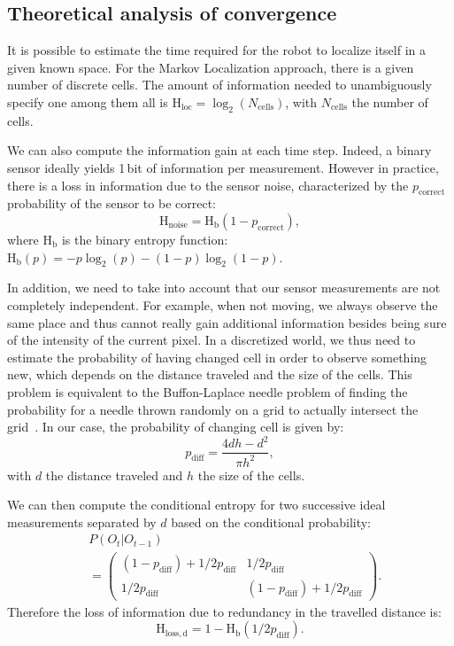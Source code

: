 \documentclass[letterpaper, 10pt, conference]{ieeeconf}
\newcommand{\ent}[1]{\mathrm{H}_\mathrm{#1}} %
\begin{document}
\subsection{Theoretical analysis of convergence}
\label{sec:theoreticalconv}

It is possible to estimate the time required for the robot to localize itself in a given known space.
For the Markov Localization approach, there is a given number of discrete cells.
The amount of information needed to unambiguously specify one among them all is $\ent{loc} = \log_2(N_\mathrm{cells})$, with $N_\mathrm{cells}$ the number of cells.

We can also compute the information gain at each time step.
Indeed, a binary sensor ideally yields 1\,bit of information per measurement.
However in practice, there is a loss in information due to the sensor noise, characterized by the $p_\mathrm{correct}$ probability of the sensor to be correct:
\begin{displaymath}
	\ent{noise} = \ent{b}(1 - p_\mathrm{correct}),
\end{displaymath}
where $\ent{b}$ is the binary entropy function: $\ent{b}(p) = -p\log_2(p) - (1-p)\log_2(1-p)$.

In addition, we need to take into account that our sensor measurements are not completely independent.
For example, when not moving, we always observe the same place and thus cannot really gain additional information besides being sure of the intensity of the current pixel.
In a discretized world, we thus need to estimate the probability of having changed cell in order to observe something new, which depends on the distance traveled and the size of the cells.
This problem is equivalent to the Buffon-Laplace needle problem of finding the probability for a needle thrown randomly on a grid to actually intersect the grid~\cite{laplace1820prob}.
In our case, the probability of changing cell is given by:
\begin{displaymath}
	p_\mathrm{diff} = \frac{4d h - d^2}{\pi h^2},
\end{displaymath}
with $d$ the distance traveled and $h$ the size of the cells.

We can then compute the conditional entropy for two successive ideal measurements separated by $d$ based on the conditional probability:
\begin{align*}
	&P(O_t | O_{t-1})\\
	&= \begin{pmatrix}
		(1 - p_\mathrm{diff}) + 1/2 p_\mathrm{diff} & 1/2 p_\mathrm{diff}\\
		1/2 p_\mathrm{diff} & (1 - p_\mathrm{diff}) + 1/2 p_\mathrm{diff}
	\end{pmatrix}.
\end{align*}
Therefore the loss of information due to redundancy in the travelled distance is:
\begin{displaymath}
	\ent{loss,d} = 1 - \ent{b}(1/2 p_\mathrm{diff}).
\end{displaymath}
\end{document}
